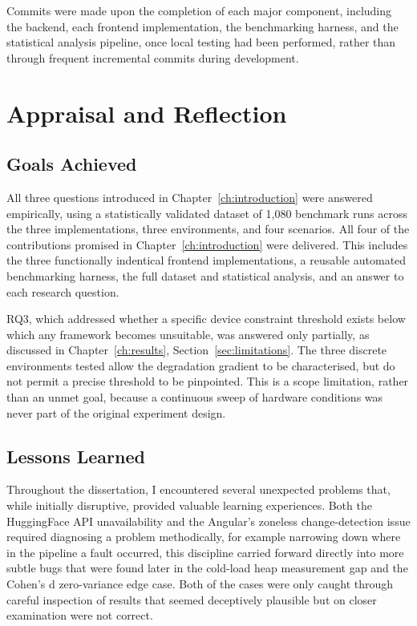 \documentclass[11pt,a4paper]{report}
\begin{document}
\vspace{5mm}

Commits were made upon the completion of each major component, including the backend, each frontend implementation, the benchmarking harness, and the statistical analysis pipeline, once local testing had been performed, rather than through frequent incremental commits during development.

\chapter{Appraisal and Reflection}
\label{ch:appraisal}

\section{Goals Achieved}    

All three questions introduced in Chapter~\ref{ch:introduction} were answered empirically, using a statistically validated dataset of 1,080 benchmark runs across the three implementations, three environments, and four scenarios. All four of the contributions promised in Chapter~\ref{ch:introduction} were delivered. This includes the three functionally indentical frontend implementations, a reusable automated benchmarking harness, the full dataset and statistical analysis, and an answer to each research question.   

\vspace{5mm}

RQ3, which addressed whether a specific device constraint threshold exists below which any framework becomes unsuitable, was answered only partially, as discussed in Chapter~\ref{ch:results}, Section~\ref{sec:limitations}. The three discrete environments tested allow the degradation gradient to be characterised, but do not permit a precise threshold to be pinpointed. This is a scope limitation, rather than an unmet goal, because a continuous sweep of hardware conditions was never part of the original experiment design. 

\section{Lessons Learned}

Throughout the dissertation, I encountered several unexpected problems that, while initially disruptive, provided valuable learning experiences. Both the HuggingFace API unavailability and the Angular's zoneless change-detection issue required diagnosing a problem methodically, for example narrowing down where in the pipeline a fault occurred, this discipline carried forward directly into more subtle bugs that were found later in the cold-load heap measurement gap and the Cohen's d zero-variance edge case. Both of the cases were only caught through careful inspection of results that seemed deceptively plausible but on closer examination were not correct.
\end{document}
